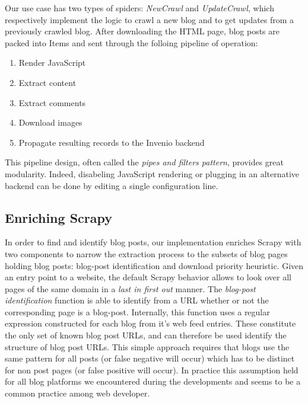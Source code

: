 Our use case has two types of spiders: \emph{NewCrawl} and \emph{UpdateCrawl}, which respectively implement the logic to crawl a new blog and to get updates from a previously crawled blog. After downloading the HTML page, blog posts are packed into Items and sent through the folloing pipeline of operation:
\begin{enumerate}[noitemsep]
  \item Render JavaScript
  \item Extract content
  \item Extract comments
  \item Download images
  \item Propagate resulting records to the Invenio backend
\end{enumerate}
This pipeline design, often called the \emph{pipes and filters pattern}\cite[Chapter Messaging Systems]{hohpe2003}, provides great modularity. Indeed, disabeling JavaScript rendering or plugging in an alternative backend can be done by editing a single configuration line.


\subsection{Enriching Scrapy}
In order to find and identify blog posts, our implementation enriches Scrapy with two components to narrow the extraction process to the subsets of blog pages holding blog posts: blog-post identification and download priority heuristic. Given an entry point to a website, the default Scrapy behavior allows to look over all pages of the same domain in a \emph{last in first out} manner. The \emph{blog-post identification} function is able to identify from a URL whether or not the corresponding page is a blog-post. Internally, this function uses a regular expression constructed for each blog from it's web feed entries. These constitute the only set of known blog post URLs, and can therefore be used identify the structure of blog post URLs. This simple approach requires that blogs use the same pattern for all posts (or false negative will occur) which has to be distinct for non post pages (or false positive will occur). In practice this assumption held for all blog platforms we encountered during the developments and seems to be a common practice among web developer.

